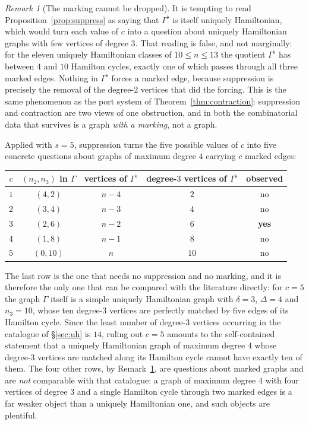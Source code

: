 \documentclass[11pt,a4paper]{article}
\theoremstyle{definition}
\theoremstyle{remark}
\newtheorem{remark}[theorem]{Remark}
\begin{document}
\begin{remark}[The marking cannot be dropped]\label{rem:marking}
It is tempting to read Proposition~\ref{prop:suppress} as saying that $\Gamma^{\flat}$ is itself uniquely Hamiltonian, which would turn each value of $c$ into a question about uniquely Hamiltonian graphs with few vertices of degree $3$. That reading is false, and not marginally: for the eleven uniquely Hamiltonian classes of $10\le n\le13$ the quotient $\Gamma^{\flat}$ has between $4$ and $10$ Hamilton cycles, exactly one of which passes through all three marked edges. Nothing in $\Gamma^{\flat}$ forces a marked edge, because suppression is precisely the removal of the degree-$2$ vertices that did the forcing. This is the same phenomenon as the port system of Theorem~\ref{thm:contraction}: suppression and contraction are two views of one obstruction, and in both the combinatorial data that survives is a graph \emph{with a marking}, not a graph.
\end{remark}

Applied with $s=5$, suppression turns the five possible values of $c$ into five concrete questions about graphs of maximum degree $4$ carrying $c$ marked edges:
\begin{center}
\begin{tabular}{ccccc}
\toprule
$c$ & $(n_2,n_3)$ in $\Gamma$ & vertices of $\Gamma^{\flat}$ & degree-$3$ vertices of $\Gamma^{\flat}$ & observed \\
\midrule
$1$ & $(4,2)$  & $n-4$ & $2$  & no \\
$2$ & $(3,4)$  & $n-3$ & $4$  & no \\
$3$ & $(2,6)$  & $n-2$ & $6$  & \textbf{yes} \\
$4$ & $(1,8)$  & $n-1$ & $8$  & no \\
$5$ & $(0,10)$ & $n$   & $10$ & no \\
\bottomrule
\end{tabular}
\end{center}
The last row is the one that needs no suppression and no marking, and it is therefore the only one that can be compared with the literature directly: for $c=5$ the graph $\Gamma$ itself is a simple uniquely Hamiltonian graph with $\delta=3$, $\Delta=4$ and $n_3=10$, whose ten degree-$3$ vertices are perfectly matched by five edges of its Hamilton cycle. Since the least number of degree-$3$ vertices occurring in the catalogue of \S\ref{sec:uh} is $14$, ruling out $c=5$ amounts to the self-contained statement that a uniquely Hamiltonian graph of maximum degree $4$ whose degree-$3$ vertices are matched along its Hamilton cycle cannot have exactly ten of them. The four other rows, by Remark~\ref{rem:marking}, are questions about marked graphs and are \emph{not} comparable with that catalogue: a graph of maximum degree $4$ with four vertices of degree $3$ and a single Hamilton cycle through two marked edges is a far weaker object than a uniquely Hamiltonian one, and such objects are plentiful.
\end{document}
